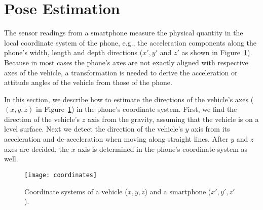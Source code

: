 \section{Pose Estimation}  \label{sec:pose}
The sensor readings from a smartphone measure the physical quantity in the local coordinate system of the phone, e.g., the acceleration components along the phone's width, length and depth directions ($x', y'$ and $z'$ as shown in Figure~\ref{pix:coordinates}). Because in most cases the phone's axes are not exactly aligned with respective axes of the vehicle, a transformation is needed to derive the acceleration or attitude angles of the vehicle from those of the phone.

In this section, we describe how to estimate the directions of the vehicle's axes ($(x, y, z)$ in Figure~\ref{pix:coordinates}) in the phone's coordinate system. First, we find the direction of the vehicle's $z$ axis from the gravity, assuming that the vehicle is on a level surface. Next we detect the direction of the vehicle's $y$ axis from its acceleration and de-acceleration when moving along straight lines. After $y$ and $z$ axes are decided, the $x$ axis is determined in the phone's coordinate system as well.

\begin{figure}[h]
  \centering
  \texttt{[image: coordinates]}\\
  \caption{Coordinate systems of a vehicle ($x,y,z$) and a smartphone ($x',y',z'$).}\label{pix:coordinates}
\end{figure}

